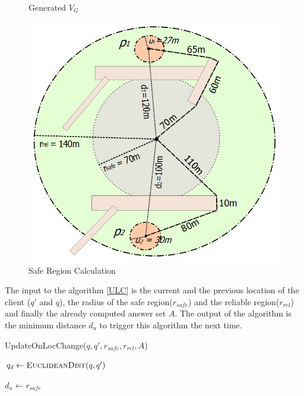 \documentclass{sig-alternate}
\begin{document}
\begin{figure}[!htb]
  \caption{Generated $V_G$}\label{fig:poi_obs_path}
\endminipage\hfill
{}%
  \includegraphics[width=\linewidth]{safe_region.png}
  \caption{Safe Region Calculation}\label{fig:safe_region}
\endminipage
\end{figure}


The input to the algorithm \ref{ULC} is the current and the previous location of the client ($q'$ and $q$), the radius of the safe region($r_{safe}$) and the reliable region($r_{rel}$) and finally the already computed answer set $A$. The output of the algorithm is the minimum distance $d_u$ to trigger this algorithm the next time.

\begin{algorithm}
\caption{UpdateOnLocChange($q, q', r_{safe}, r_{rel}, A$)}
\label{ULC}

    $q_d \gets \textsc{EuclideanDist}(q, q')$
    
    
    
    \Return $d_u \gets r_{safe}$

\end{algorithm}
\end{document}
